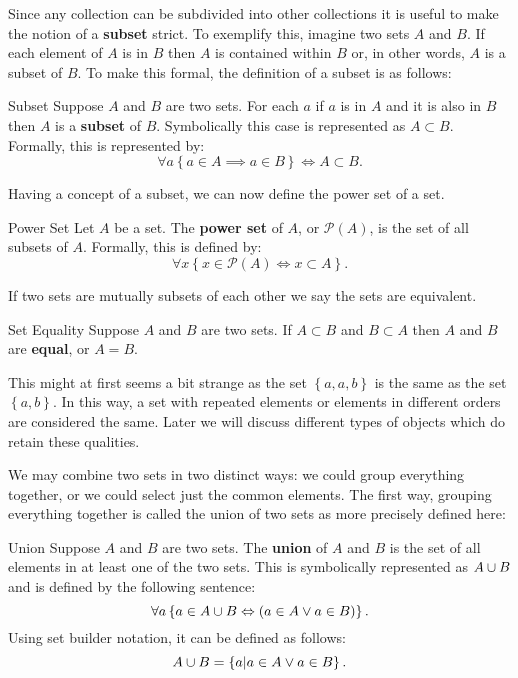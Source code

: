 Since any collection can be subdivided into other collections it is useful to make the notion of a \textbf{subset} strict.
To exemplify this, imagine two sets $A$ and $B$.
If each element of $A$ is in $B$ then $A$ is contained within $B$ or, in other words, $A$ is a subset of $B$.
To make this formal, the definition of a subset is as follows:
\begin{defn}{Subset}
  Suppose $A$ and $B$ are two sets.
  For each $a$ if $a$ is in $A$ and it is also in $B$ then $A$ is a \textbf{subset} of $B$.
  Symbolically this case is represented as $A \subset B$.
  Formally, this is represented by:
  $$
    \forall a \left\{ a \in A \implies a \in B \right\}  \Leftrightarrow A \subset B.
  $$
\end{defn}

Having a concept of a subset, we can now define the power set of a set.
\begin{defn}{Power Set}
  Let $A$ be a set.
  The \textbf{power set} of $A$, or $\mathcal{P}(A)$, is the set of all subsets of $A$.
  Formally, this is defined by:
  $$
    \forall x \left\{ x \in \mathcal{P}(A) \iff x \subset A \right\}.
  $$
\end{defn}

If two sets are mutually subsets of each other we say the sets are equivalent.
\begin{defn}{Set Equality}
  Suppose $A$ and $B$ are two sets.
  If $A \subset B$ and $B \subset A$ then $A$ and $B$ are \textbf{equal}, or $A = B$.
\end{defn}
This might at first seems a bit strange as the set $\left\{ a, a, b\right\}$ is the same as the set $\left\{ a, b \right\}$.
In this way, a set with repeated elements or elements in different orders are considered the same.
Later we will discuss different types of objects which do retain these qualities.

We may combine two sets in two distinct ways: we could group everything together, or we could select just the common elements.
The first way, grouping everything together is called the union of two sets as more precisely defined here:
\begin{defn}{Union}
  Suppose $A$ and $B$ are two sets.
  The \textbf{union} of $A$ and $B$ is the set of all elements in at least one of the two sets.
  This is symbolically represented as $A \cup B$ and is defined by the following sentence:
  $$
  \forall a \left\{ a \in A \cup B \Leftrightarrow (a \in A \vee a \in B) \right\}.
  $$
  Using set builder notation, it can be defined as follows:
  $$
    A \cup B =  \left\{ a | a \in A \vee a \in B \right\}.
  $$
\end{defn}

